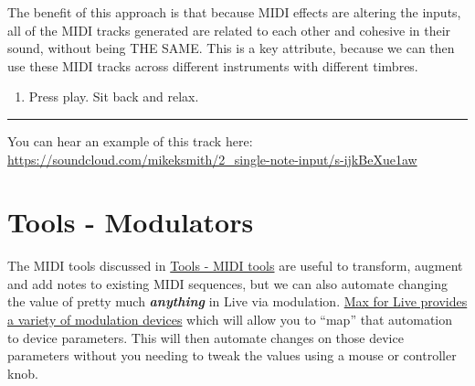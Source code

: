 \documentclass[
  12pt,
  letterpaper,
  oneside,
  open=any]{scrbook}
\providecommand{\tightlist}{%
  \setlength{\itemsep}{0pt}\setlength{\parskip}{0pt}}\usepackage{longtable,booktabs,array}
\begin{document}
The benefit of this approach is that because MIDI effects are altering
the inputs, all of the MIDI tracks generated are related to each other
and cohesive in their sound, without being THE SAME. This is a key
attribute, because we can then use these MIDI tracks across different
instruments with different timbres.

\begin{enumerate}
\def\labelenumi{\arabic{enumi}.}
\setcounter{enumi}{9}
\tightlist
\item
  Press play. Sit back and relax.
\end{enumerate}

\begin{center}\rule{0.5\linewidth}{0.5pt}\end{center}

You can hear an example of this track here:
\href{https://soundcloud.com/mikeksmith/2_single-note-input/s-ijkBeXue1aw?in=mikeksmith/sets/the-lazy-producer-recipes/s-PGMEWqfwKGz&si=4cb32f77057549d28894966ca45a2715&utm_source=clipboard&utm_medium=text&utm_campaign=social_sharing}{https://soundcloud.com/mikeksmith/2\_single-note-input/s-ijkBeXue1aw}


\chapter{Tools - Modulators}\label{Chapter-007-Tools-Modulators}

The MIDI tools discussed in
\hyperref[Chapter-004-Tools-MIDI_tools]{Tools - MIDI tools} are useful
to transform, augment and add notes to existing MIDI sequences, but we
can also automate changing the value of pretty much
\textbf{\emph{anything}} in Live via modulation.
\href{https://www.ableton.com/en/live-manual/11/max-for-live-devices/\#max-for-live-audio-effects}{Max
for Live provides a variety of modulation devices} which will allow you
to ``map'' that automation to device parameters. This will then automate
changes on those device parameters without you needing to tweak the
values using a mouse or controller knob.
\end{document}
